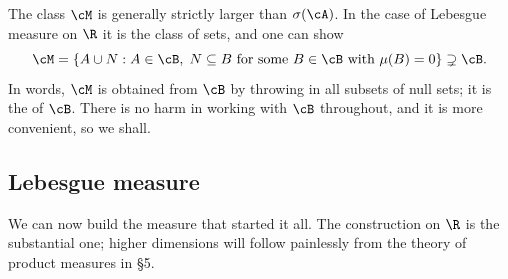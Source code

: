 \begin{remark}
	The class $\cM$ is generally strictly larger than $\sigma(\cA)$. In the case of Lebesgue measure on $\R$ it is the class of  sets, and one can show
	$$
	\cM = \{ A \cup N : A \in \cB, \; N \subseteq B \text{ for some } B \in \cB \text{ with } \mu(B) = 0 \} \supsetneq \cB.
	$$
	In words, $\cM$ is obtained from $\cB$ by throwing in all subsets of null sets; it is the  of $\cB$. There is no harm in working with $\cB$ throughout, and it is more convenient, so we shall.
\end{remark}
\subsection{Lebesgue measure}

We can now build the measure that started it all. The construction on $\R$ is the substantial one; higher dimensions will follow painlessly from the theory of product measures in \S5.

